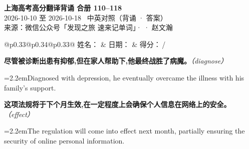 \documentclass[11pt,a4paper]{article}
\newcommand{\num}[1]{\makebox[1.9em][r]{#1.}\hspace{0.3em}}
\newcommand{\prompt}[1]{\emph{\textcolor{tipblue}{\small（#1）}}}
\begin{document}
\pagestyle{plain}
\begin{center}
{\LARGE\bfseries 上海高考高分翻译背诵 \quad 合册 110–118}\\[0.25em]
{\large 2026-10-10 至 2026-10-18 \quad\ 中英对照（背诵 · 答案）}\\[0.35em]
{\footnotesize 来源：微信公众号「发现之旅 速来记单词」·  · 赵文瀚}
\end{center}

\vspace{0.4em}
\noindent\begin{tabular}{@{}p{0.33\textwidth}@{}p{0.34\textwidth}@{}p{0.33\textwidth}@{}}
姓名：\underline{\hspace{2.0cm}} & 日期：\underline{\hspace{2.0cm}} & 得分：\underline{\hspace{1.4cm}}\,/ \\
\end{tabular}

\vspace{0.5em}

\vspace{0.8em}
\vspace{0.35em}\vspace{0.15em}

\begin{minipage}{\linewidth}

\num{1}\textbf{尽管被诊断出患有抑郁,但在家人帮助下,他最终战胜了病魔。}\prompt{diagnose}

\vspace{0.15em}

\noindent\hangindent=2.2em\hspace{2.2em}Diagnosed with depression, he eventually overcame the illness with his family’s support.

\end{minipage}

\begin{minipage}{\linewidth}

\num{2}\textbf{这项法规将于下个月生效,在一定程度上会确保个人信息在网络上的安全。}\prompt{effect}

\vspace{0.15em}

\noindent\hangindent=2.2em\hspace{2.2em}The regulation will come into effect next month, partially ensuring the security of online personal information.

\end{minipage}
\end{document}
